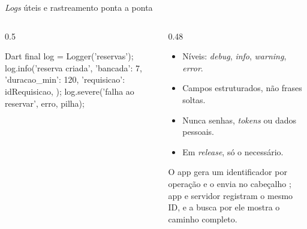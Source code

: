 \documentclass[aspectratio=169,10pt]{beamer}
\begin{document}
\begin{frame}[fragile]{\emph{Logs} úteis e rastreamento ponta a ponta}
  \begin{columns}[T]
    \begin{column}{0.5\textwidth}
\begin{codigo}[title=Dart (pacote logging)]{Dart}
final log = Logger('reservas');
log.info('reserva criada', {
  'bancada': 7, 'duracao_min': 120,
  'requisicao': idRequisicao,
});
log.severe('falha ao reservar', erro, pilha);
\end{codigo}
    \end{column}
    \begin{column}{0.48\textwidth}
      \begin{conceito}
        \begin{itemize}
          \item Níveis: \emph{debug}, \emph{info}, \emph{warning}, \emph{error}.
          \item Campos estruturados, não frases soltas.
          \item Nunca senhas, \emph{tokens} ou dados pessoais.
          \item Em \emph{release}, só o necessário.
        \end{itemize}
      \end{conceito}
      \begin{definicao}[ID de correlação]
        O app gera um identificador por operação e o envia no cabeçalho ; app e servidor registram o mesmo ID, e a busca por ele mostra o caminho completo.
      \end{definicao}
    \end{column}
  \end{columns}
\end{frame}
\end{document}
